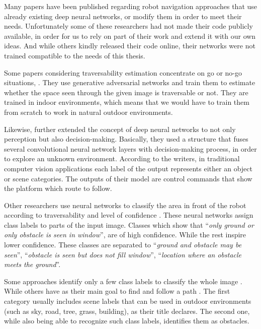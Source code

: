 \documentclass[12pt,a4paper]{report}
\newcommand{\defn}[1]{\enquote{\textit{#1}}}
\begin{document}
	Many papers have been published regarding robot navigation approaches that use 
	already existing deep neural networks, or modify them in order to meet their needs.
	Unfortunately some of these researchers had not made their code publicly available, 
	in order for us to rely on part of their work and extend it with our own ideas. And 
	while others kindly released their code online, their networks were not trained 
	compatible to the needs of this thesis.
	\par
	Some papers considering traversability estimation concentrate on go or no-go situations, 
	\citep{HiroseGonet, HiroseVunet}. They use generative adversarial networks and train 
	them to estimate whether the space seen through the given image is traversable or not. 
	They are trained in indoor environments, which means that we would have to train them 
	from scratch to work in natural outdoor environments.
	\par
	Likewise, \citet{Tai} further extended the concept of deep neural networks to not only 
	perception but also decision-making. Basically, they used a structure that fuses several 
	convolutional neural network layers with decision-making process, in order to explore 
	an unknown environment. According to the writers, in traditional computer vision 
	applications each label of the output represents either an object or scene categories. 
	The outputs of their model are control commands that show the platform which route to 
	follow.
	\par
	Other researchers use neural networks to classify the area in front of the robot 
	according to traversability and level of confidence \citep{Sermanet, Hadsell}. These 
	neural networks assign class labels to parts of the input image. Classes which show 
	that \defn{only ground or only obstacle is seen in window}, are of high confidence. 
	While the rest inspire lower confidence. These classes are separated to 
	\defn{ground and obstacle may be seen}, \defn{obstacle is seen but does not fill window}, 
	\defn{location where an obstacle meets the ground}.
	\par
	Some approaches identify only a few class labels to classify the whole image 
	\citep{Holder, Bosch, Farabet}. While others have as their main goal to find and follow 
	a path \citep{Yang, Orsic}. The first category usually includes scene labels that can 
	be used in outdoor environments (such as sky, road, tree, grass, building), as their 
	title declares. The second one, while also being able to recognize such class labels, 
	identifies them as obstacles.
	\\
	
\end{document}
